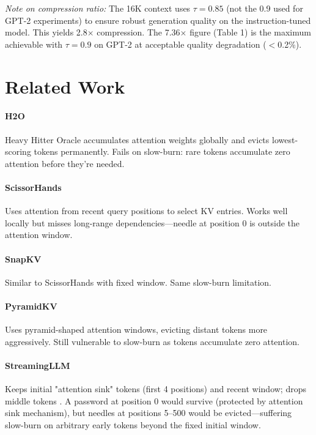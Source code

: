 \documentclass[11pt]{article}
\begin{document}
\textit{Note on compression ratio:} The 16K context uses $\tau=0.85$ (not the 0.9 used for GPT-2 experiments) to ensure robust generation quality on the instruction-tuned model. This yields 2.8$\times$ compression. The 7.36$\times$ figure (Table 1) is the maximum achievable with $\tau=0.9$ on GPT-2 at acceptable quality degradation ($<$0.2\%).

\section{Related Work}

\paragraph{H2O} Heavy Hitter Oracle accumulates attention weights globally and evicts lowest-scoring tokens permanently. Fails on slow-burn: rare tokens accumulate zero attention before they're needed.

\paragraph{ScissorHands} Uses attention from recent query positions to select KV entries. Works well locally but misses long-range dependencies---needle at position 0 is outside the attention window.

\paragraph{SnapKV} Similar to ScissorHands with fixed window. Same slow-burn limitation.

\paragraph{PyramidKV} Uses pyramid-shaped attention windows, evicting distant tokens more aggressively. Still vulnerable to slow-burn as tokens accumulate zero attention.

\paragraph{StreamingLLM} Keeps initial "attention sink" tokens (first 4 positions) and recent window; drops middle tokens \cite{streamingllm}. A password at position 0 would survive (protected by attention sink mechanism), but needles at positions 5--500 would be evicted---suffering slow-burn on arbitrary early tokens beyond the fixed initial window.
\end{document}
